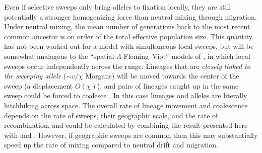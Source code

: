 \documentclass{article}
\newcommand{\gc}[1]{{\it\color{blue}#1}}
\newcommand{\plr}[1]{{\it\color{Fuchsia}#1}}
\begin{document}
Even if selective sweeps only bring alleles to fixation locally,
they are still potentially a stronger homogenizing force
than neutral mixing through migration.
Under neutral mixing, the mean number of generations back to the most recent common ancestor
is on order of the total effective population size.
This quantity has not been worked out for a model with simultaneous local sweeps,
but will be somewhat analogous to the ``spatial $\Lambda$-Fleming--Viot'' models of \citet{barton2013modelling},
in which local sweeps occur independently across the range.
Lineages that are \gc{closely linked to the sweeping allele} ($\sim v/\chi$ Morgans) will be moved
towards the center of the sweep (a displacement $O(\chi)$), 
and pairs of lineages caught up in the same sweep could be forced to coalesce 
\citep[see ][for work on geographic
hitchhiking]{barton2013genetic}. In this case lineages and alleles are literally
hitchhiking across space.
The overall rate of lineage movement and coalescence
depends on the rate of sweeps, their geographic scale, and the rate of recombination,
and could be calculated by combining the result presented here with
\citet{barton2013modelling} and \citet{barton2013genetic}. 
However, if geographic sweeps are common
then this may substantially speed up the rate of mixing compared to
neutral drift and migration. 

\end{document}
